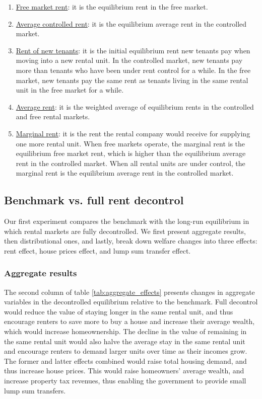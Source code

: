 \documentclass[parskip=full]{article}
\begin{document}
\begin{enumerate}
    \item \underline{Free market rent}: it is the equilibrium rent in the free market.
    \item \underline{Average controlled rent}: it is the equilibrium average rent in the controlled market.
    \item \underline{Rent of new tenants}: it is the initial equilibrium rent new tenants pay when moving into a new rental unit. In the controlled market, new tenants pay more than tenants who have been under rent control for a while. In the free market, new tenants pay the same rent as tenants living in the same rental unit in the free market for a while.
    \item \underline{Average rent}: it is the weighted average of equilibrium rents in the controlled and free rental markets.
    \item \underline{Marginal rent}: it is the rent the rental company would receive for supplying one more rental unit. When free markets operate, the marginal rent is the equilibrium free market rent, which is higher than the equilibrium average rent in the controlled market. When all rental units are under control, the marginal rent is the equilibrium average rent in the controlled market.
\end{enumerate}

\subsection{Benchmark vs. full rent decontrol}
Our first experiment compares the benchmark with the long-run equilibrium in which rental markets are fully decontrolled. We first present aggregate results, then distributional ones, and lastly, break down welfare changes into three effects: rent effect, house prices effect, and lump sum transfer effect.

\subsubsection{Aggregate results} The second column of table \ref{tab:aggregate_effects} presents changes in aggregate variables in the decontrolled equilibrium relative to the benchmark. Full decontrol would reduce the value of staying longer in the same rental unit, and thus encourage renters to save more to buy a house and increase their average wealth, which would increase homeownership. The decline in the value of remaining in the same rental unit would also halve the average stay in the same rental unit and encourage renters to demand larger units over time as their incomes grow. The former and latter effects combined would raise total housing demand, and thus increase house prices. This would raise homeowners' average wealth, and increase property tax revenues, thus enabling the government to provide small lump sum transfers.
\end{document}
